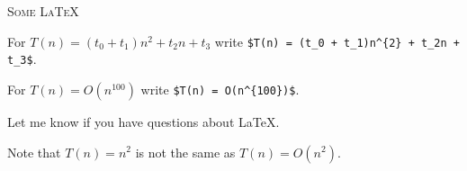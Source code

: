 \textsc{Some \LaTeX}

For $T(n) = (t_0 + t_1)n^2 + t_2 n + t_3$
write \verb!$T(n) = (t_0 + t_1)n^{2} + t_2n + t_3$!.

For $T(n) = O(n^{100})$
write \verb!$T(n) = O(n^{100})$!.

Let me know if you have questions about \LaTeX.

Note that $T(n) = n^2$ is not the same as $T(n) = O(n^2)$.

